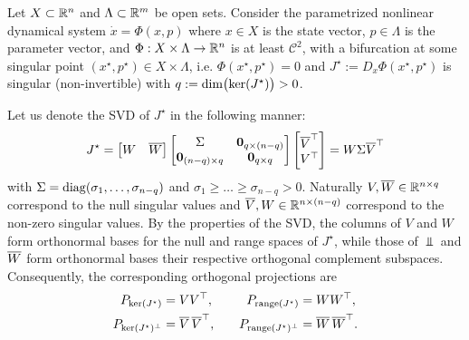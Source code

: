 \documentclass[letterpaper, 10 pt, conference]{ieeeconf}
\begin{document}
Let \(X \subset \R[n]\) and \(\Lambda \subset \R[m]\) be open sets. Consider the parametrized nonlinear dynamical system \(\dot{x} = \Phi(x,p)\) where \(x \in X\) is the state vector, \(p \in \Lambda\) is the parameter vector, and \(\Phi : X \times \Lambda \to \R[n]\) is at least \(\mathcal{C}^{2}\), with a bifurcation at some singular point \((x^{\star},p^{\star}) \in X \times \Lambda\), i.e. \(\Phi(x^{\star},p^{\star}) = 0\) and \(J^{\star} := D_{x}\Phi(x^{\star},p^{\star})\) is singular (non-invertible) with \(q := \dim\bigl(\kerJ\bigr) > 0\).

Let us denote the SVD of \(J^{\star}\) in the following manner:
\begin{equation}
    J^{\star} = \begin{bmatrix}W & \Wbar\end{bmatrix} \begin{bmatrix} \Sigma & \mathbf{0}_{q \times (n-q)} \\ \mathbf{0}_{(n-q) \times q} & \mathbf{0}_{q \times q}\end{bmatrix} \begin{bmatrix}\Vbar^{\top} \\ V^{\top}\end{bmatrix} = W\Sigma\Vbar^{\top} \label{eq:SVD}
\end{equation}
with \(\Sigma = \diag(\sigma_{1},\dots,\sigma_{n-q})\) and \(\sigma_{1} \geq \dots \geq \sigma_{n-q} > 0\). Naturally \(V, \Wbar \in \R[n \times q]\) correspond to the null singular values and \(\Vbar, W \in \R[n \times (n-q)]\) correspond to the non-zero singular values. By the properties of the SVD, the columns of \(V\) and \(W\) form orthonormal bases for the null and range spaces of \(J^{\star}\), while those of \(\Vbar\) and \(\Wbar\) form orthonormal bases their respective orthogonal complement subspaces.
Consequently, the corresponding orthogonal projections are
\begin{align}
    P_{\kerJ}                     & = VV^{\top},                                  & \quad
    P_{\range(J^{\star})}         & = WW^{\top}, \notag                                   \\
    P_{\kerJ^{\perp}}             & = \Vbar\,\Vbar^{\top},                        & \quad
    P_{\range(J^{\star})^{\perp}} & = \Wbar\,\Wbar^{\top}. \label{eq:projections}
\end{align}
\end{document}
